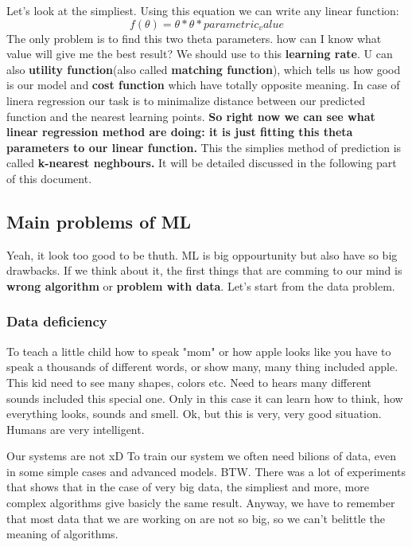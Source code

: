 \documentclass{article}
\begin{document}
  Let's look at the simpliest. Using this equation we can write any linear function:
  \begin{equation*}
    f(\theta) = \theta * \theta * parametric_value
  \end{equation*}
  The only problem is to find this two theta parameters. how can I know what value will give me the best result? We should use to this \textbf{learning rate}. U can also \textbf{utility function}(also called \textbf{matching function}), which tells us how good is our model and \textbf{cost function} which have totally opposite meaning. In case of linera regression our task is to minimalize distance between our predicted function and the nearest learning points. \textbf{So right now we can see what linear regression method are doing: it is just fitting this theta parameters to our linear function.} This the simplies method of prediction is called \textbf{k-nearest neghbours.} It will be detailed discussed in the following part of this document.
  
  \newpage
  
  \subsection{Main problems of ML}
  Yeah, it look too good to be thuth. ML is big oppourtunity but also have so big drawbacks. If we think about it, the first things that are comming to our mind is \textbf{wrong algorithm} or \textbf{problem with data}. Let's start from the data problem.
  
    \subsubsection{Data deficiency}
    To teach a little child how to speak "mom" or how apple looks like you have to speak a thousands of different words, or show many, many thing included apple. This kid need to see many shapes, colors etc. Need to hears many different sounds included this special one. Only in this case it can learn how to think, how everything looks, sounds and smell. Ok, but this is very, very good situation. Humans are very intelligent. 
    
    Our systems are not xD To train our system we often need bilions of data, even in some simple cases and advanced models. BTW. There was a lot of experiments that shows that in the case of very big data, the simpliest and more, more complex algorithms give basicly the same result. Anyway, we have to remember that most data that we are working on are not so big, so we can't belittle the meaning of algorithms.
\end{document}
